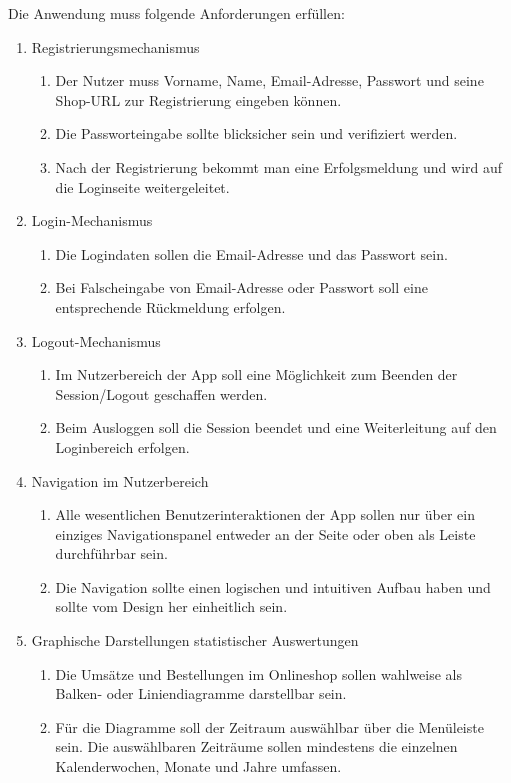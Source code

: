 Die Anwendung muss folgende Anforderungen erfüllen:
\begin{enumerate}
\item Registrierungsmechanismus
\begin{enumerate}
\item Der Nutzer muss Vorname, Name, Email-Adresse, Passwort und seine Shop-\acs{URL} zur Registrierung eingeben können.
\item Die Passworteingabe sollte blicksicher sein und verifiziert werden.
\item Nach der Registrierung bekommt man eine Erfolgsmeldung und wird auf die Loginseite weitergeleitet.
\end{enumerate}
\item Login-Mechanismus
\begin{enumerate}
\item Die Logindaten sollen die Email-Adresse und das Passwort sein.
\item Bei Falscheingabe von Email-Adresse oder Passwort soll eine entsprechende Rückmeldung erfolgen.
\end{enumerate}
\item Logout-Mechanismus
\begin{enumerate}
\item Im Nutzerbereich der App soll eine Möglichkeit zum Beenden der Session/Logout geschaffen werden.
\item Beim Ausloggen soll die Session beendet und eine Weiterleitung auf den Loginbereich erfolgen.
\end{enumerate}
\item Navigation im Nutzerbereich
\begin{enumerate}
\item Alle wesentlichen Benutzerinteraktionen der App sollen nur über ein einziges Navigationspanel entweder an der Seite oder oben als Leiste durchführbar sein.
\item Die Navigation sollte einen logischen und intuitiven Aufbau haben und sollte vom Design her einheitlich sein.
\end{enumerate}
\item Graphische Darstellungen statistischer Auswertungen
\begin{enumerate}
\item Die Umsätze und Bestellungen im Onlineshop sollen wahlweise als Balken- oder Liniendiagramme darstellbar sein.
\item Für die Diagramme soll der Zeitraum auswählbar über die Menüleiste sein. Die auswählbaren Zeiträume sollen mindestens die einzelnen Kalenderwochen, Monate und Jahre umfassen.

\end{enumerate}
\end{enumerate}
